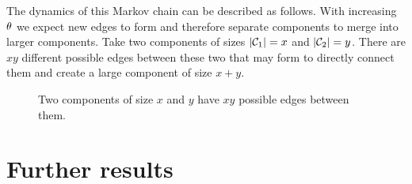 The dynamics of this Markov chain can be described as follows.
With increasing $\theta$ we expect new edges to form and therefore separate components to merge into larger components.
Take two components of sizes $|\mathcal{C}_1| = x$ and $|\mathcal{C}_2| = y$.
There are $xy$ different possible edges between these two that may form to directly connect them 
and create a large component of size $x+y$.

\begin{figure}[H]
	\centering
	
	\caption{Two components of size $x$ and $y$ have $xy$ possible edges between them.}
	\label{F: components}
\end{figure} 

\section{Further results}
